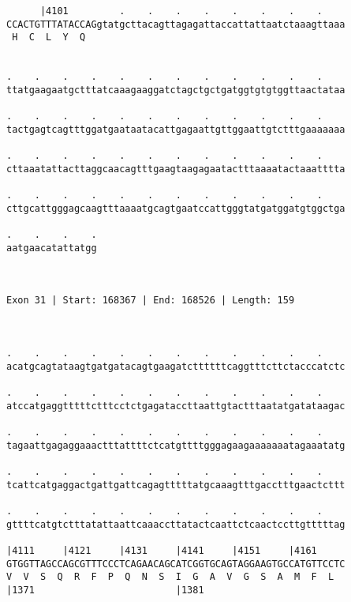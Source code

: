 \documentclass{article}
\begin{document}
\begin{Verbatim}
      |4101         .    .    .    .    .    .    .    .    
CCACTGTTTATACCAGgtatgcttacagttagagattaccattattaatctaaagttaaa
 H  C  L  Y  Q                                              
                                                            
  
.    .    .    .    .    .    .    .    .    .    .    .    
ttatgaagaatgctttatcaaagaaggatctagctgctgatggtgtgtggttaactataa
                                                            
.    .    .    .    .    .    .    .    .    .    .    .    
tactgagtcagtttggatgaataatacattgagaattgttggaattgtctttgaaaaaaa
                                                            
.    .    .    .    .    .    .    .    .    .    .    .    
cttaaatattacttaggcaacagtttgaagtaagagaatactttaaaatactaaatttta
                                                            
.    .    .    .    .    .    .    .    .    .    .    .    
cttgcattgggagcaagtttaaaatgcagtgaatccattgggtatgatggatgtggctga
                                                            
.    .    .    .
aatgaacatattatgg
                
                
 
Exon 31 | Start: 168367 | End: 168526 | Length: 159



.    .    .    .    .    .    .    .    .    .    .    .    
acatgcagtataagtgatgatacagtgaagatcttttttcaggtttcttctacccatctc
                                                            
.    .    .    .    .    .    .    .    .    .    .    .    
atccatgaggtttttctttcctctgagataccttaattgtactttaatatgatataagac
                                                            
.    .    .    .    .    .    .    .    .    .    .    .    
tagaattgagaggaaactttattttctcatgttttgggagaagaaaaaaatagaaatatg
                                                            
.    .    .    .    .    .    .    .    .    .    .    .    
tcattcatgaggactgattgattcagagtttttatgcaaagtttgacctttgaactcttt
                                                            
.    .    .    .    .    .    .    .    .    .    .    .    
gttttcatgtctttatattaattcaaaccttatactcaattctcaactccttgtttttag
                                                            
|4111     |4121     |4131     |4141     |4151     |4161     
GTGGTTAGCCAGCGTTTCCCTCAGAACAGCATCGGTGCAGTAGGAAGTGCCATGTTCCTC
V  V  S  Q  R  F  P  Q  N  S  I  G  A  V  G  S  A  M  F  L  
|1371                         |1381                         
  

\end{Verbatim}
\end{document}
